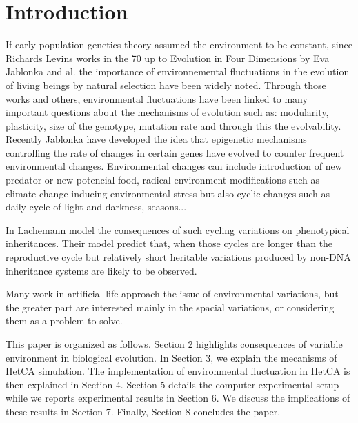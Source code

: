 \documentclass{sig-alternate-05-2015}
\begin{document}


\section{Introduction}
If early population genetics theory assumed the environment to be constant, since Richards Levins works \cite{levins1968evolution} in the 70 up to Evolution in Four Dimensions by Eva Jablonka and al. \cite{jablonka2014evolution} the importance of environnemental fluctuations in the evolution of living beings by natural selection have been widely noted. Through those works and others, environmental fluctuations have been linked to many important questions about the mechanisms of evolution such as: modularity, plasticity, size of the genotype, mutation rate and through this the evolvability. Recently Jablonka\cite{jablonka2014evolution} have developed the idea that epigenetic mechanisms controlling the rate of changes in certain genes have evolved to counter frequent environmental changes. 
Environmental changes can include introduction of new predator or new potencial food, radical environment modifications such as climate change inducing environmental stress but also cyclic changes such as daily cycle of light and darkness, seasons...  

In \cite{lachmann1996inheritance} Lachemann model the consequences of such cycling variations on phenotypical inheritances. Their model predict that, when those cycles are longer than the reproductive cycle but relatively short heritable variations produced by non-DNA inheritance systems are likely to be observed.

Many work in artificial life approach the issue of environmental variations, but the greater part are interested mainly in the spacial variations, or considering them as a problem to solve.

This paper is organized as follows. Section 2 highlights consequences of variable environment in biological evolution. In Section 3, we explain the mecanisms of HetCA simulation. The implementation of environmental fluctuation in HetCA  is then explained in Section 4. Section 5 details the computer experimental setup while we reports experimental results in Section 6. We discuss the implications of these results in Section 7. Finally, Section 8 concludes the paper.
\end{document}
